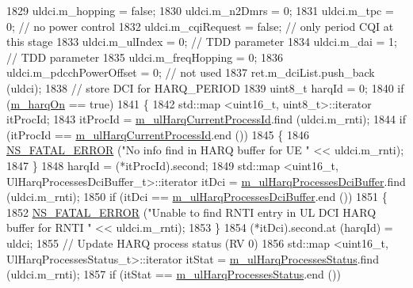 \begin{DoxyCode}
1829       uldci.m\_hopping = \textcolor{keyword}{false};
1830       uldci.m\_n2Dmrs = 0;
1831       uldci.m\_tpc = 0; \textcolor{comment}{// no power control}
1832       uldci.m\_cqiRequest = \textcolor{keyword}{false}; \textcolor{comment}{// only period CQI at this stage}
1833       uldci.m\_ulIndex = 0; \textcolor{comment}{// TDD parameter}
1834       uldci.m\_dai = 1; \textcolor{comment}{// TDD parameter}
1835       uldci.m\_freqHopping = 0;
1836       uldci.m\_pdcchPowerOffset = 0; \textcolor{comment}{// not used}
1837       ret.m\_dciList.push\_back (uldci);
1838       \textcolor{comment}{// store DCI for HARQ\_PERIOD}
1839       uint8\_t harqId = 0;
1840       \textcolor{keywordflow}{if} (\hyperlink{classns3_1_1PfFfMacScheduler_a20ee9882187d440870b2a88b63fcb7e9}{m\_harqOn} == \textcolor{keyword}{true})
1841         \{
1842           std::map <uint16\_t, uint8\_t>::iterator itProcId;
1843           itProcId = \hyperlink{classns3_1_1PfFfMacScheduler_aff9dac165a5c80c99f237adf365321d6}{m\_ulHarqCurrentProcessId}.find (uldci.m\_rnti);
1844           \textcolor{keywordflow}{if} (itProcId == \hyperlink{classns3_1_1PfFfMacScheduler_aff9dac165a5c80c99f237adf365321d6}{m\_ulHarqCurrentProcessId}.end ())
1845             \{
1846               \hyperlink{group__fatal_ga5131d5e3f75d7d4cbfd706ac456fdc85}{NS\_FATAL\_ERROR} (\textcolor{stringliteral}{"No info find in HARQ buffer for UE "} << uldci.m\_rnti);
1847             \}
1848           harqId = (*itProcId).second;
1849           std::map <uint16\_t, UlHarqProcessesDciBuffer\_t>::iterator itDci = 
      \hyperlink{classns3_1_1PfFfMacScheduler_a694ef4299832b3652468b0898601b2de}{m\_ulHarqProcessesDciBuffer}.find (uldci.m\_rnti);
1850           \textcolor{keywordflow}{if} (itDci == \hyperlink{classns3_1_1PfFfMacScheduler_a694ef4299832b3652468b0898601b2de}{m\_ulHarqProcessesDciBuffer}.end ())
1851             \{
1852               \hyperlink{group__fatal_ga5131d5e3f75d7d4cbfd706ac456fdc85}{NS\_FATAL\_ERROR} (\textcolor{stringliteral}{"Unable to find RNTI entry in UL DCI HARQ buffer for RNTI "} << 
      uldci.m\_rnti);
1853             \}
1854           (*itDci).second.at (harqId) = uldci;
1855           \textcolor{comment}{// Update HARQ process status (RV 0)}
1856           std::map <uint16\_t, UlHarqProcessesStatus\_t>::iterator itStat = 
      \hyperlink{classns3_1_1PfFfMacScheduler_a5d5e9dcdbb7d0a291fe397ba7b746d04}{m\_ulHarqProcessesStatus}.find (uldci.m\_rnti);
1857           \textcolor{keywordflow}{if} (itStat == \hyperlink{classns3_1_1PfFfMacScheduler_a5d5e9dcdbb7d0a291fe397ba7b746d04}{m\_ulHarqProcessesStatus}.end ())

\end{DoxyCode}
